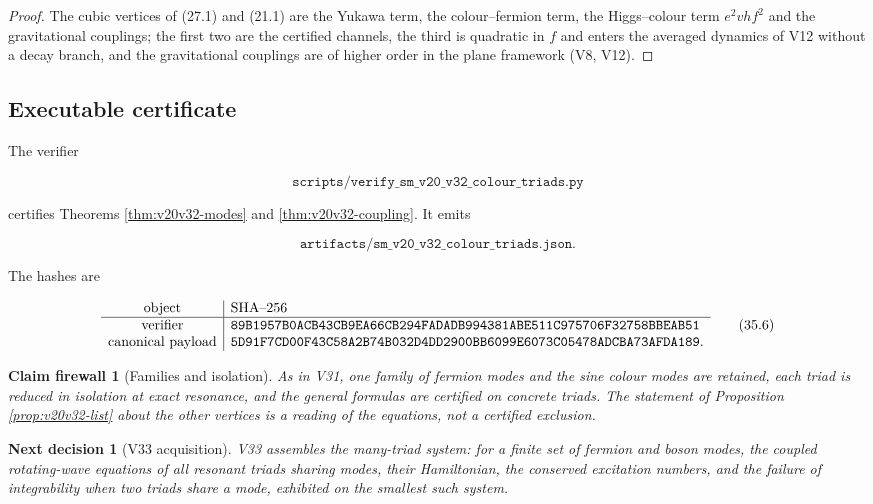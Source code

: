 \documentclass[11pt]{article}
\newtheorem{firewall}[theorem]{Claim firewall}
\newtheorem{decision}[theorem]{Next decision}
\theoremstyle{remark}
\begin{document}
\begin{proof}
The cubic vertices of (27.1) and (21.1) are the Yukawa term, the
colour--fermion term, the Higgs--colour term \(e^2vhf^2\) and the
gravitational couplings; the first two are the certified channels,
the third is quadratic in \(f\) and enters the averaged dynamics of
V12 without a decay branch, and the gravitational couplings are of
higher order in the plane framework (V8, V12).
\end{proof}

\subsection{Executable certificate}

The verifier

\[
 \texttt{scripts/verify\_sm\_v20\_v32\_colour\_triads.py}             \tag{35.4}
\]

certifies Theorems \ref{thm:v20v32-modes} and
\ref{thm:v20v32-coupling}.  It emits

\[
 \texttt{artifacts/sm\_v20\_v32\_colour\_triads.json}.                \tag{35.5}
\]

The hashes are

\[
\begin{array}{c|l}
\hbox{object}&\hbox{SHA--256}\\ \hline
\hbox{verifier}&
\texttt{89B1957B0ACB43CB9EA66CB294FADADB994381ABE511C975706F32758BBEAB51}\\
\hbox{canonical payload}&
\texttt{5D91F7CD00F43C58A2B74B032D4DD2900BB6099E6073C05478ADCBA73AFDA189}.
\end{array}                                                     \tag{35.6}
\]

\begin{firewall}[Families and isolation]
\label{fire:v20v32}
As in V31, one family of fermion modes and the sine colour modes are
retained, each triad is reduced in isolation at exact resonance, and
the general formulas are certified on concrete triads.  The
statement of Proposition \ref{prop:v20v32-list} about the other
vertices is a reading of the equations, not a certified exclusion.
\end{firewall}

\begin{decision}[V33 acquisition]
\label{dec:v20v32-next}
V33 assembles the many-triad system: for a finite set of fermion
and boson modes, the coupled rotating-wave equations of all resonant
triads sharing modes, their Hamiltonian, the conserved excitation
numbers, and the failure of integrability when two triads share a
mode, exhibited on the smallest such system.
\end{decision}
\end{document}
